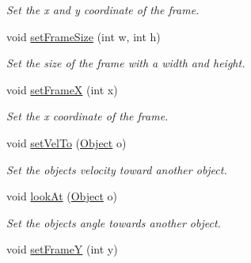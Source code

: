 \begin{DoxyCompactItemize}
\begin{DoxyCompactList}\small\item\em Set the x and y coordinate of the frame. \end{DoxyCompactList}\item 
void \hyperlink{classObject_a2ec266f6f1f6bdc3c3cd001f2dc6daef}{set\+Frame\+Size} (int w, int h)\hypertarget{classObject_a2ec266f6f1f6bdc3c3cd001f2dc6daef}{}\label{classObject_a2ec266f6f1f6bdc3c3cd001f2dc6daef}

\begin{DoxyCompactList}\small\item\em Set the size of the frame with a width and height. \end{DoxyCompactList}\item 
void \hyperlink{classObject_ad4ad32edcec36e9fa63290070c991575}{set\+FrameX} (int x)\hypertarget{classObject_ad4ad32edcec36e9fa63290070c991575}{}\label{classObject_ad4ad32edcec36e9fa63290070c991575}

\begin{DoxyCompactList}\small\item\em Set the x coordinate of the frame. \end{DoxyCompactList}\item 
void \hyperlink{classObject_afa2ef385cd0c7e76134d4a11b8643d38}{set\+Vel\+To} (\hyperlink{classObject}{Object} o)\hypertarget{classObject_afa2ef385cd0c7e76134d4a11b8643d38}{}\label{classObject_afa2ef385cd0c7e76134d4a11b8643d38}

\begin{DoxyCompactList}\small\item\em Set the object\textquotesingle{}s velocity toward another object. \end{DoxyCompactList}\item 
void \hyperlink{classObject_a327a4b938d5f97db0ca6b9c8722f6e35}{look\+At} (\hyperlink{classObject}{Object} o)\hypertarget{classObject_a327a4b938d5f97db0ca6b9c8722f6e35}{}\label{classObject_a327a4b938d5f97db0ca6b9c8722f6e35}

\begin{DoxyCompactList}\small\item\em Set the object\textquotesingle{}s angle towards another object. \end{DoxyCompactList}\item 
void \hyperlink{classObject_adbbc257d38397971e16016287b653952}{set\+FrameY} (int y)\hypertarget{classObject_adbbc257d38397971e16016287b653952}{}\label{classObject_adbbc257d38397971e16016287b653952}


\end{DoxyCompactItemize}
